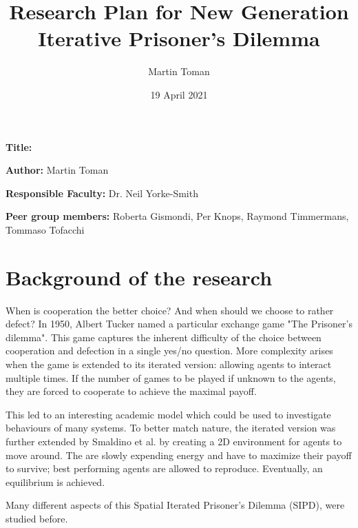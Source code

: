 \documentclass[english]{article}
\title{Research Plan for New Generation Iterative Prisoner's Dilemma}
\author{Martin Toman}
\date{19 April 2021}
\newcommand{\namelistlabel}[1]{\mbox{#1}\hfil}
\newenvironment{namelist}[1]{%
\begin{list}{}{
  \let\makelabel\namelistlabel
  \settowidth{\labelwidth}{#1}
  \setlength{\leftmargin}{1.1\labelwidth}
}}{%
\end{list}}
\begin{document}
\listoftodos

\maketitle
\begin{namelist}{}
\item[{\bf Title:}]
\item[{\bf Author:}]
  Martin Toman
\item[{\bf Responsible Faculty:}]
  Dr. Neil Yorke-Smith
\item[{\bf Peer group members:}]
  Roberta Gismondi,
  Per Knops,
  Raymond Timmermans,
  Tommaso Tofacchi
\end{namelist}



\section*{Background of the research}
When is cooperation the better choice? And when should we choose to rather defect?
In 1950, Albert Tucker named a particular exchange game "The Prisoner’s dilemma".\cite{encyclopedia} This game captures the inherent difficulty of the choice between cooperation and defection in a single yes/no question.
More complexity arises when the game is extended to its iterated version: allowing agents to interact multiple times. If the number of games to be played if unknown to the agents, they are forced to cooperate to achieve the maximal payoff.

This led to an interesting academic model which could be used to investigate behaviours of many systems.
To better match nature, the iterated version was further extended by Smaldino et al.\cite{smaldino} by creating a 2D environment for agents to move around. The are slowly expending energy and have to maximize their payoff to survive; best performing agents are allowed to reproduce. Eventually, an equilibrium is achieved.

Many different aspects of this Spatial Iterated Prisoner’s Dilemma (SIPD), were studied before. 

\end{document}
